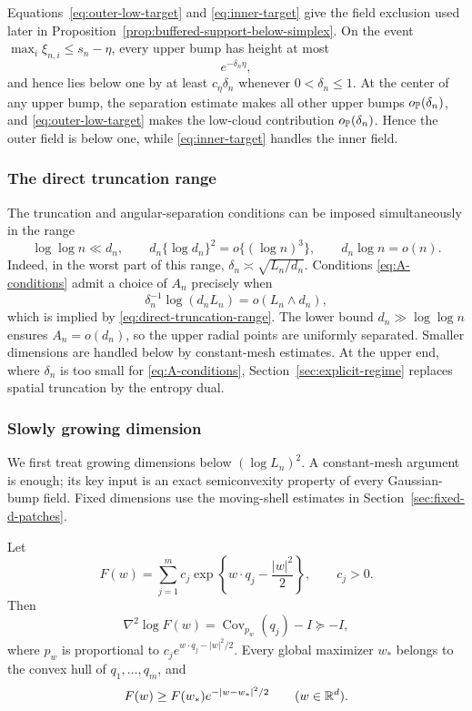 Equations~\eqref{eq:outer-low-target} and \eqref{eq:inner-target} give the
field exclusion used later in
Proposition~\ref{prop:buffered-support-below-simplex}. On the event
\(\max_i\xi_{n,i}\le s_n-\eta\), every upper bump has height at most
\[
  e^{-\delta_n\eta},
\]
and hence lies below one by at least \(c_\eta\delta_n\) whenever
\(0<\delta_n\le1\).
At the center of any upper bump, the separation estimate makes all other
upper bumps \(o_{\mathbb P}(\delta_n)\), and \eqref{eq:outer-low-target} makes the
low-cloud contribution \(o_{\mathbb P}(\delta_n)\). Hence the outer field is below one, while
\eqref{eq:inner-target} handles the inner field.

\subsubsection{The direct truncation range}

The truncation and angular-separation conditions can be imposed
simultaneously in the range
\begin{equation}
\label{eq:direct-truncation-range}
  \log\log n\ll d_n,
  \qquad
  d_n\{\log d_n\}^2=o\{(\log n)^3\},
  \qquad
  d_n\log n=o(n).
\end{equation}
Indeed, in the worst part of this range,
\(\delta_n\asymp\sqrt{L_n/d_n}\). Conditions
\eqref{eq:A-conditions} admit a choice of \(A_n\) precisely when
\[
  \delta_n^{-1}\log(d_nL_n)=o(L_n\wedge d_n),
\]
which is implied by \eqref{eq:direct-truncation-range}. The lower bound
\(d_n\gg\log\log n\) ensures \(A_n=o(d_n)\), so the upper radial points are
uniformly separated. Smaller dimensions are handled below by constant-mesh
estimates. At the upper end, where \(\delta_n\) is too small for
\eqref{eq:A-conditions}, Section~\ref{sec:explicit-regime} replaces spatial
truncation by the entropy dual.

\subsubsection{Slowly growing dimension}
\label{sec:slow-dimension}

We first treat growing dimensions below \((\log L_n)^2\). A constant-mesh
argument is enough; its key input is an exact semiconvexity property of every
Gaussian-bump field. Fixed dimensions use the moving-shell estimates in
Section~\ref{sec:fixed-d-patches}.

\begin{lemma}
\label{lem:slow-truncated-shell}
Let
\[
 F(w)=\sum_{j=1}^m c_j
 \exp\left\{w\cdot q_j-\frac{|w|^2}{2}\right\},
 \qquad c_j>0.
\]
Then
\begin{equation}
\label{eq:semiconvex-log-field}
 \nabla^2\log F(w)=\operatorname{Cov}_{p_w}(q_j)-I\succeq-I,
\end{equation}
where \(p_w\) is proportional to
\(c_j e^{w\cdot q_j-|w|^2/2}\).  Every global maximizer \(w_*\) belongs
to the convex hull of \(q_1,\ldots,q_m\), and
\begin{equation}
\label{eq:semiconvex-net-transfer}
 F(w)\ge F(w_*)e^{-|w-w_*|^2/2}
 \qquad(w\in\mathbb R^d).
\end{equation}
\end{lemma}

